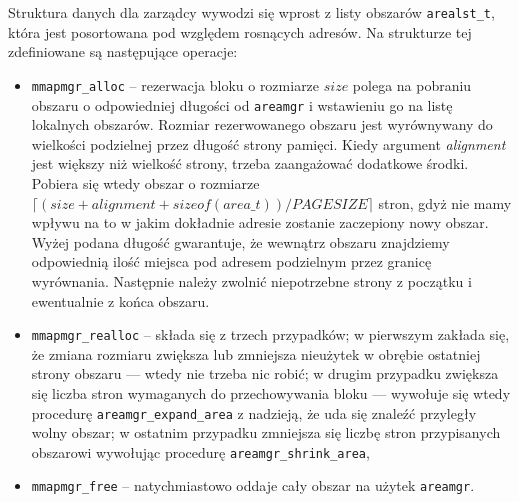 \documentclass[12pt,a4paper,titlepage,twoside]{mwart}
\begin{document}

Struktura danych dla zarządcy wywodzi się wprost z listy obszarów
\verb+arealst_t+, która jest posortowana pod względem rosnących adresów. Na
strukturze tej zdefiniowane są następujące operacje:
\begin{itemize}
\item \verb+mmapmgr_alloc+ -- rezerwacja bloku o rozmiarze $size$ polega na
pobraniu obszaru o odpowiedniej długości od \verb+areamgr+ i wstawieniu go na
listę lokalnych obszarów. Rozmiar rezerwowanego obszaru jest wyrównywany do
wielkości podzielnej przez długość strony pamięci. Kiedy argument
\textit{alignment} jest większy niż wielkość strony, trzeba zaangażować
dodatkowe środki. Pobiera się wtedy obszar o rozmiarze $\lceil (size +
alignment + sizeof(area\_t)) / PAGESIZE\rceil$ stron, gdyż nie mamy wpływu na to
w jakim dokładnie adresie zostanie zaczepiony nowy obszar. Wyżej podana długość
gwarantuje, że wewnątrz obszaru znajdziemy odpowiednią ilość miejsca pod
adresem podzielnym przez granicę wyrównania. Następnie należy zwolnić
niepotrzebne strony z początku i ewentualnie z końca obszaru.
\item \verb+mmapmgr_realloc+ -- składa się z trzech przypadków; w pierwszym
zakłada się, że zmiana rozmiaru zwiększa lub zmniejsza nieużytek w obrębie
ostatniej strony obszaru --- wtedy nie trzeba nic robić; w drugim przypadku
zwiększa się liczba stron wymaganych do przechowywania bloku --- wywołuje się
wtedy procedurę \verb+areamgr_expand_area+ z nadzieją, że uda się znaleźć
przyległy wolny obszar; w ostatnim przypadku zmniejsza się liczbę stron
przypisanych obszarowi wywołując procedurę \verb+areamgr_shrink_area+,
\item \verb+mmapmgr_free+ -- natychmiastowo oddaje cały obszar na użytek
\verb+areamgr+.
\end{itemize}
\end{document}
